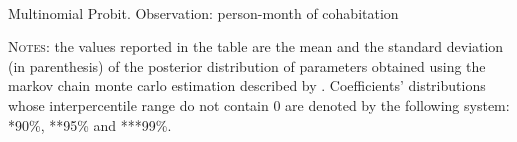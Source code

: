 \documentclass[12pt]{article}
\numberwithin{table}{section}
\begin{document}
	\begin{table}[htbp]\centering
		\caption{\\Multinomial Probit. Observation: person-month of cohabitation}
		\label{table:mpc}
		\begin{threeparttable}[t]\centering
			
			\begin{tablenotes}[flushleft]
				\footnotesize{\item \textsc{Notes}: the values reported in the table are the mean and the standard deviation (in parenthesis) of the posterior distribution of parameters obtained using the markov chain monte carlo estimation described by \cite{imai2005a}.
				Coefficients' distributions whose interpercentile range do not contain 0 are denoted by the following system: *90\%, **95\%  and ***99\%.}
			\end{tablenotes}
		\end{threeparttable}
	\end{table}

\FloatBarrier
\FloatBarrier
\end{document}
